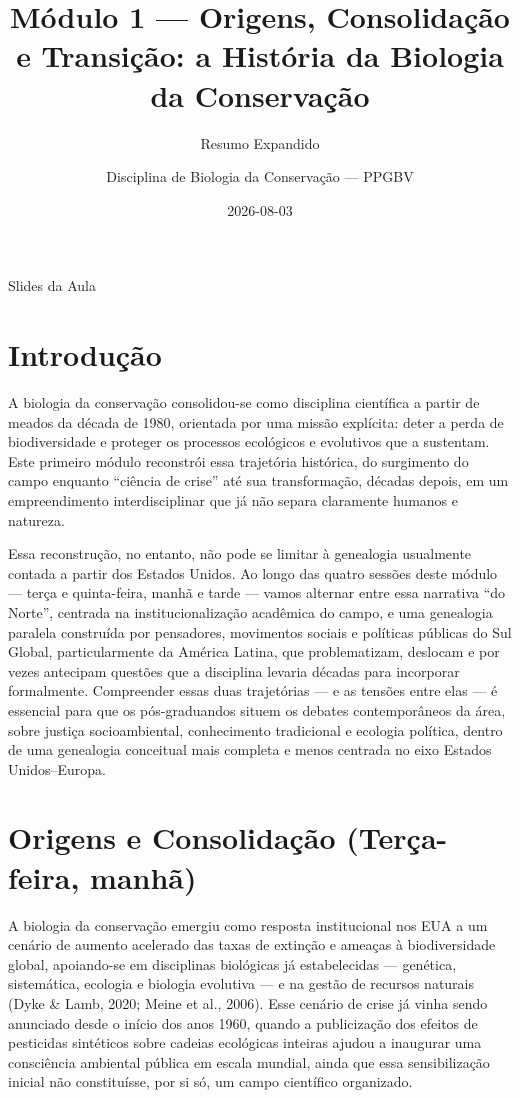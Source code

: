 \documentclass[
  portuguese,
  letterpaper,
  DIV=11,
  numbers=noendperiod]{scrartcl}
\title{Módulo 1 --- Origens, Consolidação e Transição: a História da
Biologia da Conservação}
\subtitle{Resumo Expandido}
\author{Disciplina de Biologia da Conservação --- PPGBV}
\date{2026-08-03}
\renewcommand*\contentsname{Índice}
\newcommand\contentsname{Índice}
\begin{document}
\maketitle

\renewcommand*\contentsname{Índice}
{
\setcounter{tocdepth}{3}
\tableofcontents
}

Slides da Aula

\section{Introdução}\label{introduuxe7uxe3o}

A biologia da conservação consolidou-se como disciplina científica a
partir de meados da década de 1980, orientada por uma missão explícita:
deter a perda de biodiversidade e proteger os processos ecológicos e
evolutivos que a sustentam. Este primeiro módulo reconstrói essa
trajetória histórica, do surgimento do campo enquanto ``ciência de
crise'' até sua transformação, décadas depois, em um empreendimento
interdisciplinar que já não separa claramente humanos e natureza.

Essa reconstrução, no entanto, não pode se limitar à genealogia
usualmente contada a partir dos Estados Unidos. Ao longo das quatro
sessões deste módulo --- terça e quinta-feira, manhã e tarde --- vamos
alternar entre essa narrativa ``do Norte'', centrada na
institucionalização acadêmica do campo, e uma genealogia paralela
construída por pensadores, movimentos sociais e políticas públicas do
Sul Global, particularmente da América Latina, que problematizam,
deslocam e por vezes antecipam questões que a disciplina levaria décadas
para incorporar formalmente. Compreender essas duas trajetórias --- e as
tensões entre elas --- é essencial para que os pós-graduandos situem os
debates contemporâneos da área, sobre justiça socioambiental,
conhecimento tradicional e ecologia política, dentro de uma genealogia
conceitual mais completa e menos centrada no eixo Estados
Unidos--Europa.

\section{Origens e Consolidação (Terça-feira,
manhã)}\label{origens-e-consolidauxe7uxe3o-teruxe7a-feira-manhuxe3}

A biologia da conservação emergiu como resposta institucional nos EUA a
um cenário de aumento acelerado das taxas de extinção e ameaças à
biodiversidade global, apoiando-se em disciplinas biológicas já
estabelecidas --- genética, sistemática, ecologia e biologia evolutiva
--- e na gestão de recursos naturais (Dyke \& Lamb, 2020; Meine et al.,
2006). Esse cenário de crise já vinha sendo anunciado desde o início dos
anos 1960, quando a publicização dos efeitos de pesticidas sintéticos
sobre cadeias ecológicas inteiras ajudou a inaugurar uma consciência
ambiental pública em escala mundial, ainda que essa sensibilização
inicial não constituísse, por si só, um campo científico organizado.
\end{document}
